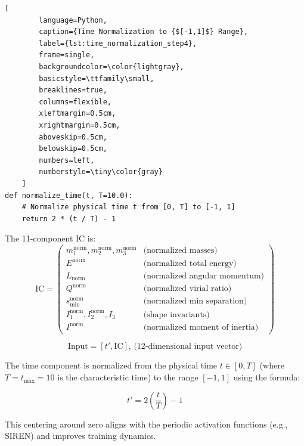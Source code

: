 \documentclass{article}
\begin{document}
\begin{enumerate}
    \begin{lstlisting}[
        language=Python,
        caption={Time Normalization to {$[-1,1]$} Range},
        label={lst:time_normalization_step4},
        frame=single,
        backgroundcolor=\color{lightgray},
        basicstyle=\ttfamily\small,
        breaklines=true,
        columns=flexible,
        xleftmargin=0.5cm,
        xrightmargin=0.5cm,
        aboveskip=0.5cm,
        belowskip=0.5cm,
        numbers=left,
        numberstyle=\tiny\color{gray}
    ]
def normalize_time(t, T=10.0):
    # Normalize physical time t from [0, T] to [-1, 1]
    return 2 * (t / T) - 1
    \end{lstlisting}

    The 11-component IC is:
    \begin{equation}
    \text{IC} = \begin{pmatrix}
    m_1^{\text{norm}}, m_2^{\text{norm}}, m_3^{\text{norm}} & \text{(normalized masses)} \\
    E^{\text{norm}} & \text{(normalized total energy)} \\
    L_{\text{norm}} & \text{(normalized angular momentum)} \\
    Q^{\text{norm}} & \text{(normalized virial ratio)} \\
    s_{\min}^{\text{norm}} & \text{(normalized min separation)} \\
    I_1^{\text{norm}}, I_2^{\text{norm}}, I_3 & \text{(shape invariants)} \\
    I^{\text{norm}} & \text{(normalized moment of inertia)}
    \end{pmatrix}
    \end{equation}
\end{enumerate}

    \begin{equation}
        \text{Input} = [t', \text{IC}] \text{, (12-dimensional input vector)}
    \end{equation}

    The time component is normalized from the physical time $t \in [0, T]$ (where $T = t_{\max} = 10$ is the characteristic time) to the range $[-1, 1]$ using the formula:

    \begin{equation}
    t' = 2 \left( \frac{t}{T} \right) - 1
    \end{equation}

    This centering around zero aligns with the periodic activation functions (e.g., SIREN) and improves training dynamics.
\end{document}

